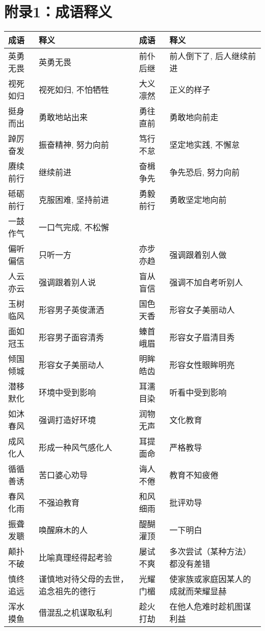 \section{附录1：成语释义}


\begin{longtable}{|p{}|p{}|p{}|p{}|}
\hline
\textbf{成语} & \textbf{释义} & \textbf{成语} & \textbf{释义} \\
\hline
英勇无畏 & 英勇无畏 & 前仆后继 & 前人倒下了, 后人继续前进 \\
\hline
视死如归 & 视死如归, 不怕牺牲 & 大义凛然 & 正义的样子 \\
\hline
挺身而出 & 勇敢地站出来 & 勇往直前 & 勇敢地向前走 \\
\hline
踔厉奋发 & 振奋精神, 努力向前 & 笃行不怠 & 坚定地实践, 不懈怠 \\
\hline
赓续前行 & 继续前进 & 奋楫争先 & 争先恐后, 努力向前 \\
\hline
砥砺前行 & 克服困难, 坚持前进 & 勇毅前行 & 勇敢坚定地向前 \\
\hline
一鼓作气 & 一口气完成, 不松懈 & & \\
\hline
偏听偏信 & 只听一方 & 亦步亦趋 & 强调跟着别人做 \\
\hline
人云亦云 & 强调跟着别人说 & 盲从盲信 & 强调不加自考听别人 \\
\hline
玉树临风 & 形容男子英俊潇洒 & 国色天香 & 形容女子美丽动人 \\
\hline
面如冠玉 & 形容男子面容清秀 & 螓首峨眉 & 形容女子眉清目秀 \\
\hline
倾国倾城 & 形容女子美丽动人 & 明眸皓齿 & 形容女性眼眸明亮 \\
\hline
潜移默化 & 环境中受到影响 & 耳濡目染 & 听看中受到影响 \\
\hline
如沐春风 & 强调打造好环境 & 润物无声 & 文化教育 \\
\hline
成风化人 & 形成一种风气感化人 & 耳提面命 & 严格教导 \\
\hline
循循善诱 & 苦口婆心劝导 & 诲人不倦 & 教育不知疲倦 \\
\hline
春风化雨 & 不强迫教育 & 和风细雨 & 批评劝导 \\
\hline
振聋发聩 & 唤醒麻木的人 & 醍醐灌顶 & 一下明白 \\
\hline
颠扑不破 & 比喻真理经得起考验 & 屡试不爽 & 多次尝试（某种方法）都没有差错 \\
\hline
慎终追远 & 谨慎地对待父母的去世，追念祖先的德行 & 光耀门楣 & 使家族或家庭因某人的成就而荣耀显赫 \\
\hline
浑水摸鱼 & 借混乱之机谋取私利 & 趁火打劫 & 在他人危难时趁机图谋利益 \\

\end{longtable}

